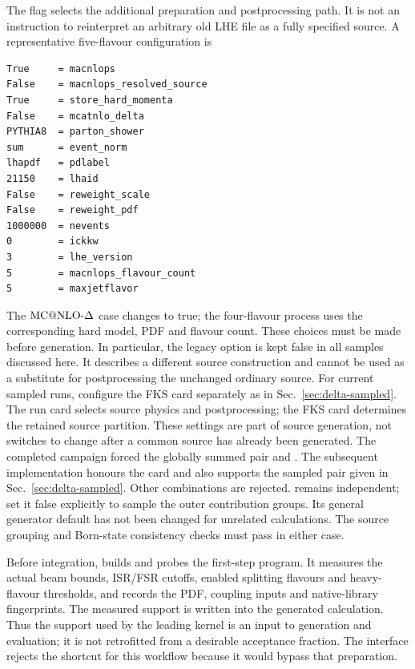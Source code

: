 The flag  selects the additional
preparation and postprocessing path.  It is not an instruction to
reinterpret an arbitrary old LHE file as a fully specified
\macnlops{} source.  A representative five-flavour configuration is
\begin{verbatim}
True     = macnlops
False    = macnlops_resolved_source
True     = store_hard_momenta
False    = mcatnlo_delta
PYTHIA8  = parton_shower
sum      = event_norm
lhapdf   = pdlabel
21150    = lhaid
False    = reweight_scale
False    = reweight_pdf
1000000  = nevents
0        = ickkw
3        = lhe_version
5        = macnlops_flavour_count
5        = maxjetflavor
\end{verbatim}
The \(\text{MC@NLO-}\Delta\) case changes
 to true; the four-flavour process uses
the corresponding hard model, PDF and flavour count.  These choices must
be made before generation.  In particular, the legacy
 option is kept false in all
samples discussed here.  It describes a different source construction
and cannot be used as a substitute for postprocessing the unchanged
ordinary source.
For current sampled runs, configure the FKS card separately as in
Sec.~\ref{sec:delta-sampled}. The run card selects source physics and
postprocessing; the FKS card determines the retained source partition.
These settings are part of source generation, not switches to change
after a common source has already been generated.
The completed campaign forced the globally summed pair
 and
. The subsequent
implementation honours the card and also supports the sampled pair
given in Sec.~\ref{sec:delta-sampled}. Other combinations are rejected.
 remains independent; set it false
explicitly to sample the outer contribution groups. Its general
generator default has not been changed for unrelated calculations.
The source grouping and Born-state consistency checks must pass in
either case.

Before integration,  builds and
probes the first-step program.  It measures the actual beam bounds,
ISR/FSR cutoffs, enabled splitting flavours and heavy-flavour thresholds,
and records the PDF, coupling inputs and native-library fingerprints.
The measured support is written into the generated calculation.  Thus
the support used by the leading kernel is an input to generation and
evaluation; it is not retrofitted from a desirable acceptance fraction.
The interface rejects the  shortcut for
this workflow because it would bypass that preparation.

